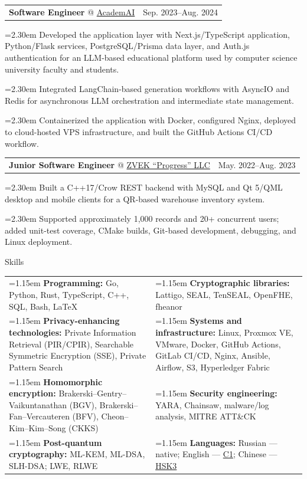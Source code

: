 \documentclass[11pt,a4paper]{article}
\makeatletter
\newcommand{\cvrow}[2]{%
  \noindent
  \begin{minipage}[t]{0.145\textwidth}
    \vspace{0pt}%
    \raggedright
    \fontsize{10.5}{12.5}\selectfont
    #1
  \end{minipage}%
  \hfill
  \begin{minipage}[t]{0.835\textwidth}
    \vspace{0pt}%
    #2
  \end{minipage}\par
}
\newcommand{\skillcell}[2]{%
  \noindent
  \hangindent=1.15em
  \hangafter=1
  \makebox[1.15em][l]{$\diamond$}%
  \textbf{#1} #2%
}
\newcommand{\workentry}[2]{%
  \noindent
  \begin{tabularx}{\linewidth}
    {@{}X@{\hspace{0.8em}}r@{}}
    #1 & \small #2
  \end{tabularx}\par
  \vspace{0.15em}
}
\newcommand{\workproject}[1]{%
  \noindent
  \hangindent=2.30em
  \hangafter=1
  \hspace*{1.15em}\makebox[1.15em][l]{$\diamond$}#1\par
  \vspace{0.12em}
}
\makeatother
\begin{document}
\vspace{0.50em}

\cvrow{}{%
  \workentry
    {\textbf{Software Engineer} @ \href{https://academai.ru/}{AcademAI}}
    {Sep. 2023--Aug. 2024}
  \workproject{Developed the application layer with Next.js/TypeScript application,
  Python/Flask services, PostgreSQL/Prisma data layer, and Auth.js authentication
  for an LLM-based educational platform used by computer science university faculty
  and students.}
  \workproject{Integrated LangChain-based generation workflows with AsyncIO and Redis for
  asynchronous LLM orchestration and intermediate state management.}
  \workproject{Containerized the application with Docker, configured Nginx, deployed
  to cloud-hosted VPS infrastructure, and built the GitHub Actions CI/CD workflow.}
}

\cvrow{}{%
  \workentry
    {\textbf{Junior Software Engineer} @
    \href{https://zvekprogress.ru/}{ZVEK ``Progress'' LLC}}
    {May. 2022--Aug. 2023}

  \workproject{Built a C++17/Crow REST backend with MySQL and Qt 5/QML desktop
  and mobile clients for a QR-based warehouse inventory system.}

  \workproject{Supported approximately 1,000 records and 20+ concurrent users;
  added unit-test coverage, CMake builds, Git-based development, debugging, and Linux deployment.}
}
\vspace{0.75em}

\cvrow{Skills}{%
  \begin{tabularx}{\linewidth}
    {@{}>{\raggedright\arraybackslash}X
    @{\hspace{1.2em}}
    >{\raggedright\arraybackslash}X@{}}

    \skillcell{Programming:}{%
      Go, Python, Rust, TypeScript, C++, SQL, Bash, LaTeX}
    &
    \skillcell{Cryptographic libraries:}{%
      Lattigo, SEAL, TenSEAL, OpenFHE, fheanor}
    \\[0.20em]

    \skillcell{Privacy-enhancing technologies:}{%
      Private Information Retrieval (PIR/CPIR),
      Searchable Symmetric Encryption (SSE),
      Private Pattern Search}
    &
    \skillcell{Systems and infrastructure:}{%
      Linux, Proxmox VE, VMware, Docker,
      GitHub Actions, GitLab CI/CD, Nginx, Ansible,
      Airflow, S3, Hyperledger Fabric}
    \\[0.20em]

    \skillcell{Homomorphic encryption:}{%
      Brakerski--Gentry--Vaikuntanathan (BGV),
      Brakerski--Fan--Vercauteren (BFV),
      Cheon--Kim--Kim--Song (CKKS)}
    &
    \skillcell{Security engineering:}{%
      YARA, Chainsaw, malware/log analysis,
      MITRE ATT\&CK}
    \\[0.20em]

    \skillcell{Post-quantum cryptography:}{%
      ML-KEM, ML-DSA, SLH-DSA; LWE, RLWE}
    &
    \skillcell{Languages:}{%
      Russian --- native;
      English --- \href{https://iasenovets.github.io/files/toefl_8cd5f4a2b8ec8f34da49ea0faeef43f1.pdf}{C1};
      Chinese --- \href{https://admin.chinesetest.cn/queryScore.do?sid=c2tActR9Wb\%2704b861aefbdc5e9fd0b44afa717d08cbceb0720e582ce25f\%2724d7sWsQ5nVUQSwD}{HSK3}}
  \end{tabularx}
}
\end{document}
